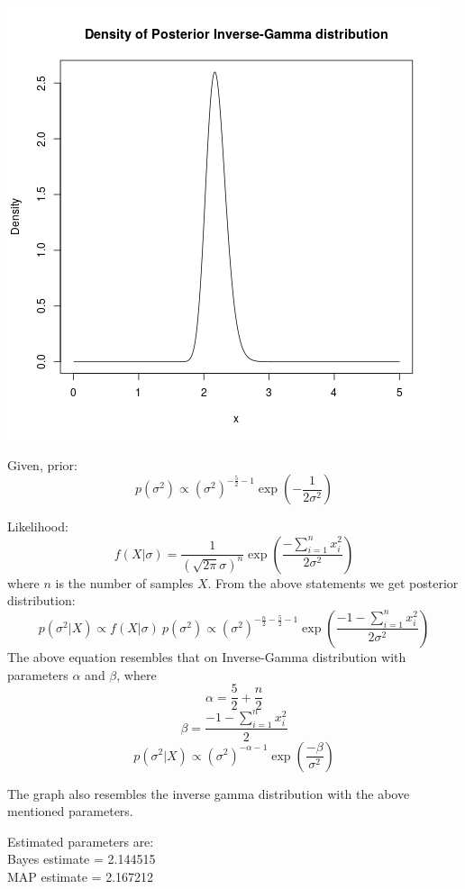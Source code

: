 \documentclass{article}
\begin{document}
\includegraphics{posteriorDensity.png}
\pagebreak

Given, prior:
\[
p(\sigma^2) \propto (\sigma^2)^{-\frac{5}{2} - 1} \exp(-\frac{1}{2\sigma^2})
\]

Likelihood:
\[
f(X | \sigma) = \frac{1}{(\sqrt{2\pi}\sigma)^n} \exp(\frac{-\sum_{i=1}^{n}x_i^2}{2\sigma^2})
\]
where $n$ is the number of samples $X$. From the above statements we get posterior distribution:
\[
p(\sigma^2|X) \propto f(X | \sigma)\ p(\sigma^2) \propto (\sigma^2)^{-\frac{n}{2}-\frac{5}{2} - 1} \exp(\frac{-1-\sum_{i=1}^{n}x_i^2}{2\sigma^2})
\]
The above equation resembles that on Inverse-Gamma distribution with parameters $\alpha$ and $\beta$, where
\[
\alpha = \frac{5}{2} + \frac{n}{2}
\]\[
\beta = \frac{-1-\sum_{i=1}^{n}x_i^2}{2}
\]\[
p(\sigma^2|X) \propto (\sigma^2)^{-\alpha - 1} \exp(\frac{-\beta}{\sigma^2})
\]

The graph also resembles the inverse gamma distribution with the above mentioned parameters.

Estimated parameters are: \\
Bayes estimate = 2.144515\\
MAP estimate = 2.167212
\end{document}
